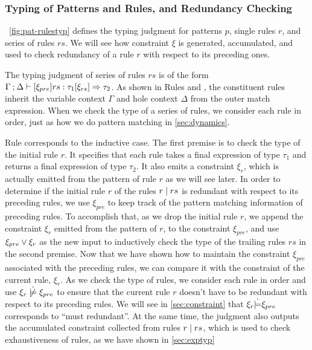 \subsubsection{Typing of Patterns and Rules, and Redundancy Checking}
\label{sec:pattyp}



\figurename~\ref{fig:pat-rulestyp} defines the typing judgment for patterns $p$,
single rules $r$, and series of rules $rs$. We will see how constraint $\xi$ is
generated, accumulated, and used to check redundancy of a rule $r$ with respect
to its preceding ones.

The typing judgment of series of rules $rs$ is of the form
$\Gamma \mathbin{;} \Delta \vdash [\xi_{pre}] rs : \tau_1 [\xi_{rs}] \Rightarrow \tau_2$. As shown
in Rules \TMatchZPre and \TMatchNZPre, the constituent rules inherit the
variable context $\Gamma$ and hole context $\Delta$ from the outer match
expression. When we check the type of a series of rules, we consider each rule
in order, just as how we do pattern matching in \autoref{sec:dynamics}.

Rule \TRules corresponds to the inductive case. The first premise is to check
the type of the initial rule $r$. It specifies that each rule takes a final expression
of type $\tau_1$ and returns a final expression of type $\tau_2$. It also emits
a constraint $\xi_r$, which is actually emitted from the pattern of rule $r$ as
we will see later. In order to determine if the initial rule $r$ of the rules
$r \mid rs$ is redundant with respect to its preceding rules, we use
$\xi_{pre}$ to keep track of the pattern matching information of preceding
rules. To accomplish that, as we drop the initial rule $r$, we append the
constraint $\xi_r$ emitted from the pattern of $r$, to the constraint
$\xi_{pre}$, and use $\xi_{pre} \vee \xi_r$ as the new input to inductively check the type
of the trailing rules $rs$ in the second premise. Now that we have shown how to maintain the
constraint $\xi_{pre}$ associated with the preceding rules, we can compare it
with the constraint of the current rule, $\xi_r$. As we check the
type of rules, we consider each rule in order and use
$\cnotsatisfy{\xi_r}{\xi_{pre}}$ to ensure that the current rule $r$ doesn't
have to be redundant with respect to its preceding rules. We will see in
\autoref{sec:constraint} that $\xi_r \dot{\models} \xi_{pre}$ corresponds to
``must redundant''. At the same time, the judgment also outputs the accumulated
constraint collected from rules $r \mid rs$, which is used to check
exhaustiveness of rules, as we have shown in \autoref{sec:exptyp}

